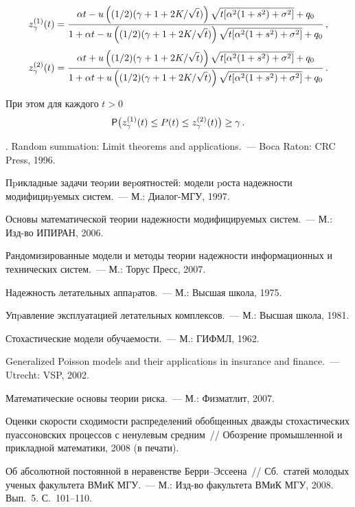 $$
z^{(1)}_{\gamma}(t)=\displaystyle\frac{\displaystyle \alpha
t-u\left ((1/2)(\gamma+1+2K/\sqrt{t})\right)
\sqrt{t[\alpha^2(1+s^2)+\sigma^2]}+q_0\mathstrut}{\displaystyle 1+\alpha
t-u\left((1/2)(\gamma+1+2K/\sqrt{t})\right)
\sqrt{t[\alpha^2(1+s^2)+\sigma^2]}+q_0\mathstrut}\,,
$$
$$
z^{(2)}_{\gamma}(t)=\displaystyle\frac{\displaystyle \alpha
t+u\left((1/2)(\gamma+1+2K/\sqrt{t})\right)
\sqrt{t[\alpha^2(1+s^2)+\sigma^2]}+q_0\mathstrut}{\displaystyle 1+\alpha
t+u\left((1/2)(\gamma+1+2K/\sqrt{t})\right)
\sqrt{t[\alpha^2(1+s^2)+\sigma^2]}+q_0\mathstrut}\,.
$$


\noindent
При этом для каждого $t>0$
$$
{\sf P}\big(z^{(1)}_{\gamma}(t)\le P(t)\le
z^{(2)}_{\gamma}(t)\big)\ge\gamma\,.
$$
\pagebreak

\begin{multicols}{2}

{\small\frenchspacing
{%
\begin{thebibliography}{99}

.
Random summation: Limit theorems
and applications.~--- Boca Raton: CRC Press, 1996. %

Пpикладные задачи теоpии веpоятностей: модели pоста
надежности модифициpуемых сис\-тем.~--- М.: Диалог-МГУ,
1997. %

Основы математической теории надежности
модифицируемых систем.~--- М.: Изд-во ИПИРАН, 2006. %

Рандомизированные модели и методы теории надежности информационных
и технических систем.~--- М.: Торус Пресс, 2007. %

Надежность летательных
аппаpатов.~--- М.: Высшая школа, 1975. %

Упpавление эксплуатацией летательных
комплексов.~--- М.: Высшая школа, 1981. %

Стохастические модели обучаемости.~--- М.: ГИФМЛ, 1962. %

Generalized Poisson models and
their applications in insurance and finance.~--- Utrecht: VSP, 2002. %

Математические основы теории
риска.~--- М.: Физматлит, 2007. %

Оценки скорости сходимости распределений
обобщенных дважды стохастических пуассоновских процессов с
ненулевым средним~// Обозрение промышленной и прикладной %
мате\-ма\-ти\-ки, 2008 (в печати). %

\label{end\stat}

Об абсолютной постоянной в неравенстве
Берри--Эссеена~// Сб.\ статей молодых ученых факультета ВМиК
МГУ.~--- М.: Изд-во факультета ВМиК МГУ, 2008. Вып.~5. С.~101--110. %
\end{thebibliography}
}
}
\end{multicols}